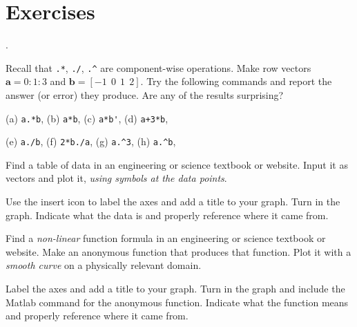 \section*{Exercises}
\begin{list}
{.}{}

\item Recall that \verb&.*&, \verb&./&, \verb&.^& are component-wise operations.
Make row vectors $\mathbf{a} = 0:1:3$ and $\mathbf{b} = [-1 \  \ 0 \  \ 1 \  \ 2]$.
Try the following commands and report the answer (or error) they produce. Are any of the results surprising?

(a)  \verb&a.*b&, \hspace{.2in}    (b)  \verb&a*b&, \hspace{.2in}  (c)  \verb&a*b'&, \hspace{.2in}  (d)  \verb&a+3*b&,  

(e)   \verb&a./b&, \hspace{.2in}    (f)  \verb&2*b./a&,   \hspace{.2in}  (g)  \verb&a.^3&, \hspace{.2in}  (h) \verb&a.^b&,


\item Find a table of data in an engineering or science textbook or 
  website. Input it as vectors and plot it, {\em using symbols at the data points}. 
  
  Use the insert icon to
  label the axes and add a title to your graph. Turn in the graph.
  Indicate what the data is and properly reference where it came from.
  
\item  Find a {\em non-linear} function formula in an engineering or science textbook or 
  website. Make an anonymous function that produces that function. Plot it
  with a {\em smooth curve}  on a physically relevant  domain. 
  
  Label the axes and add a title to your
   graph. Turn in the graph and include the Matlab command for 
   the anonymous function. Indicate what the function means and properly 
   reference where it came from.
   


\end{list}







